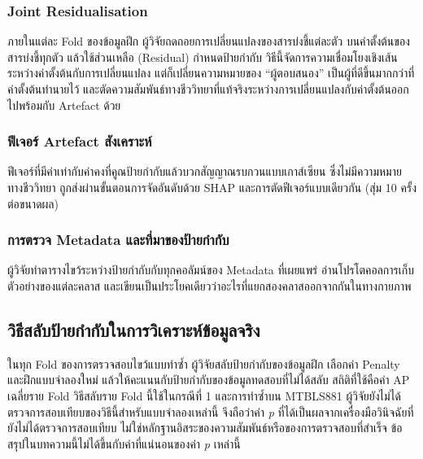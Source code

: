 \documentclass[11pt,a4paper]{article}
\begin{document}
\subsubsection{Joint Residualisation}
ภายในแต่ละ Fold ของข้อมูลฝึก ผู้วิจัยถดถอยการเปลี่ยนแปลงของสารบ่งชี้แต่ละตัว
บนค่าตั้งต้นของสารบ่งชี้ทุกตัว แล้วใช้ส่วนเหลือ (Residual) กำหนดป้ายกำกับ
วิธีนี้จัดการความเชื่อมโยงเชิงเส้นระหว่างค่าตั้งต้นกับการเปลี่ยนแปลง
แต่ก็เปลี่ยนความหมายของ ``ผู้ตอบสนอง'' เป็นผู้ที่ดีขึ้นมากกว่าที่ค่าตั้งต้นทำนายไว้
และตัดความสัมพันธ์ทางชีววิทยาที่แท้จริงระหว่างการเปลี่ยนแปลงกับค่าตั้งต้นออกไปพร้อมกับ
Artefact ด้วย

\subsubsection{ฟีเจอร์ Artefact สังเคราะห์}
ฟีเจอร์ที่มีค่าเท่ากับค่าคงที่คูณป้ายกำกับแล้วบวกสัญญาณรบกวนแบบเกาส์เซียน
ซึ่งไม่มีความหมายทางชีววิทยา ถูกส่งผ่านขั้นตอนการจัดอันดับด้วย SHAP
และการตัดฟีเจอร์แบบเดียวกัน (สุ่ม 10 ครั้งต่อขนาดผล)

\subsubsection{การตรวจ Metadata และที่มาของป้ายกำกับ}
ผู้วิจัยทำตารางไขว้ระหว่างป้ายกำกับกับทุกคอลัมน์ของ Metadata ที่เผยแพร่
อ่านโปรโตคอลการเก็บตัวอย่างของแต่ละคลาส
และเขียนเป็นประโยคเดียวว่าอะไรที่แยกสองคลาสออกจากกันในทางกายภาพ

\subsection{วิธีสลับป้ายกำกับในการวิเคราะห์ข้อมูลจริง}
ในทุก Fold ของการตรวจสอบไขว้แบบทำซ้ำ ผู้วิจัยสลับป้ายกำกับของข้อมูลฝึก
เลือกค่า Penalty และฝึกแบบจำลองใหม่
แล้วให้คะแนนกับป้ายกำกับของข้อมูลทดสอบที่ไม่ได้สลับ
สถิติที่ใช้คือค่า AP เฉลี่ยราย Fold วิธีสลับราย Fold นี้ใช้ในกรณีที่ 1
และการทำซ้ำบน MTBLS881
ผู้วิจัยยังไม่ได้ตรวจการสอบเทียบของวิธีนี้สำหรับแบบจำลองเหล่านี้
จึงถือว่าค่า \textit{p} ที่ได้เป็นผลจากเครื่องมือวินิจฉัยที่ยังไม่ได้ตรวจการสอบเทียบ
ไม่ใช่หลักฐานอิสระของความสัมพันธ์หรือของการตรวจสอบที่สำเร็จ
ข้อสรุปในบทความนี้ไม่ได้ขึ้นกับค่าที่แน่นอนของค่า \textit{p} เหล่านี้
\end{document}
